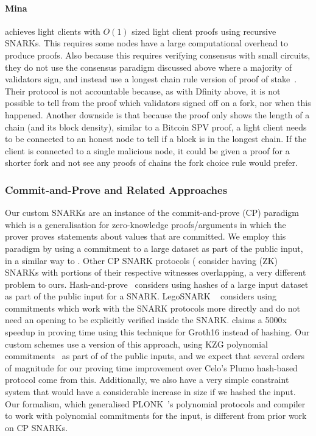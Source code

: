 \paragraph{Mina~\cite{mina}} achieves light clients with $O(1)$ sized light client proofs using recursive SNARKs. This requires some nodes have a large computational overhead to produce proofs. Also because this requires verifying consensus with small circuits, they do not use the consensus paradigm
discussed above where a majority of validators sign, and instead use a longest chain rule version of proof of stake~\cite{mina}.
Their protocol is not accountable because, as with Dfinity above, it is not possible to tell from the proof which validators signed off on a fork, nor when this happened.
Another downside is that because the proof only shows the length of a chain (and its block density), similar to a Bitcoin SPV proof, a light client needs to be
connected to an honest node to tell if a block is in the longest chain. If the client is connected to a single malicious node, it could be given a proof for a
shorter fork and not see any proofs of chains the fork choice rule would prefer.

\vspace{-0.3cm}
\subsubsection{Commit-and-Prove and Related Approaches}
\label{sec:commit_prove}

\noindent Our custom SNARKs are an instance of the commit-and-prove (CP) paradigm~\cite{KilianPhD,CLOS02,CP_proposal,HP_paper,CP_paper,lunar,eclipse}
which is a generalisation for zero-knowledge proofs/arguments in which the prover proves statements about values that are committed. We employ this paradigm by 
using a commitment to a large dataset as part of the public input, in a similar way to \cite{HP_paper,CP_paper}. Other CP SNARK protocols (\cite{CP_paper,interoperability_2,lunar,eclipse} 
consider having (ZK) SNARKs with portions of their respective witnesses overlapping, a very different problem to ours. Hash-and-prove~\cite{HP_paper} considers using hashes of a large 
input dataset as part of the public input for a SNARK. LegoSNARK ~\cite{CP_paper} considers using commitments which work with the SNARK protocols more directly and do not need an 
opening to be explicitly verified inside the SNARK. \cite{CP_paper} claims a 5000x speedup in proving time using this technique for Groth16 instead of hashing. Our custom schemes use 
a version of this approach, using KZG polynomial commitments~\cite{KZG_10} as part of of the public inputs, and we expect that several orders of magnitude for our proving time improvement 
over Celo's Plumo hash-based protocol come from this. Additionally, we also have a very simple constraint system that would have a considerable increase in size if we hashed the input.
Our formalism, which generalised PLONK~\cite{plonk}'s polynomial protocols and compiler to work with polynomial commitments for the input, is different from prior work on CP SNARKs. \\

